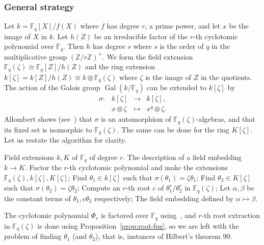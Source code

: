 \documentclass{mcom-l}
\theoremstyle{plain}
\theoremstyle{definition}
\DeclareMathOperator{\gal}{Gal} %
\newcommand{\Z}{\ensuremath{\mathbb{Z}}}
\newcommand{\F}{\ensuremath{\mathbb{F}}}
\newcommand{\MM}{\ensuremath{\mathsf{M}}}
\newcounter{algorithm}
\begin{document}
\subsubsection{General strategy}
Let $k=\F_q[X]/f(X)$ where $f$ has degree $r$, a prime power, and let $x$ be the image of $X$ in $k$.
Let $h(Z)$ be an 
irreducible factor of the $r$-th cyclotomic polynomial over $\F_q$. Then $h$ has degree $s$ where 
$s$ is the order of $q$ in the multiplicative group $(\Z/r\Z)^\times$. We form the field extension
$\F_q(\zeta) \cong \F_q[Z] / h(Z)$ and the ring extension $k[\zeta] = k[Z] / h(Z) \cong k \otimes
\F_q(\zeta)$ where $\zeta$ is the image of $Z$ in the quotients. The action of the Galois group
$\gal(k / \F_q)$ can be extended to $k[\zeta]$ by
\[
\left.
\begin{array}{llll}
\sigma: & k[\zeta] & \rightarrow & k[\zeta], \\
& x \otimes \zeta & \mapsto & x^q \otimes \zeta.
\end{array}
\right.
\]
Allombert shows (see~\cite[Prop.~3.2]{Allombert02}) that $\sigma$ is
an automorphism of $\F_q(\zeta)$-algebras, and that its fixed set is
isomorphic to $\F_q(\zeta)$.
The same can be done for the ring $K[\zeta]$.
Let us restate the algorithm for clarity.

\begin{algorithm}
	\begin{algorithmic}[1]
		\REQUIRE Field extensions $k, K$ of $\F_q$ of degree $r$.
		\ENSURE The description of a field embedding $k\to K$.
		\STATE Factor the $r$-th cyclotomic polynomial and make the extensions $\F_q(\zeta), 
		k[\zeta], K[\zeta]$;
		\STATE Find $\theta_1 \in k[\zeta]$ such that $\sigma(\theta_1) = \zeta\theta_1$;
		\STATE Find $\theta_2 \in K[\zeta]$ such that $\sigma(\theta_2) = \zeta\theta_2$;
		\STATE Compute an $r$-th root $c$ of $\theta_1^r / \theta_2^r$ in $\F_q(\zeta)$;
		\STATE Let $\alpha, \beta$ be the constant terms of $\theta_1, c\theta_2$ respectively;
		\RETURN The field embedding defined by $\alpha\mapsto\beta$.
	\end{algorithmic}
        \label{alog:allombert}
\end{algorithm}


The cyclotomic polynomial $\Phi_r$ is factored over $\F_q$
using~\cite[Theorem~9]{shoup94}, and $r$-th root extraction in
$\F_q(\zeta)$ is done using Proposition~\ref{prop:root-fpz}, so we are
left with the problem of finding $\theta_1$ (and $\theta_2$), that is,
instances of Hilbert's theorem 90.  
\end{document}
